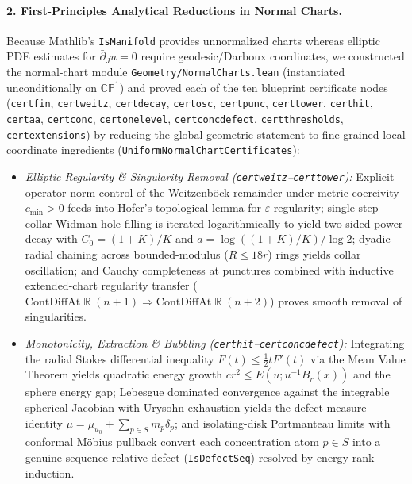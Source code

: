 \documentclass[10pt]{article}
\renewcommand{\_}{\origus\allowbreak}
\newcommand{\CP}{\mathbb{CP}^1}
\newcommand{\R}{\mathbb{R}}
\newcommand{\eps}{\varepsilon}
\newcommand{\code}[1]{\texttt{#1}}
\begin{document}
\paragraph{2. First-Principles Analytical Reductions in Normal Charts.}
Because Mathlib's \code{IsManifold} provides unnormalized charts whereas elliptic PDE estimates for
$\bar\partial_J u = 0$ require geodesic/Darboux coordinates, we constructed the normal-chart module
\code{Geometry/NormalCharts.lean} (instantiated unconditionally on $\CP$) and proved each of the
ten blueprint certificate nodes (\code{cert\_fin}, \code{cert\_weitz}, \code{cert\_decay},
\code{cert\_osc}, \code{cert\_punc}, \code{cert\_tower}, \code{cert\_hit}, \code{cert\_aa},
\code{cert\_conc}, \code{cert\_onelevel}, \code{cert\_concdefect}, \code{cert\_thresholds},
\code{cert\_extensions}) by reducing the global geometric statement to fine-grained local coordinate
ingredients (\code{UniformNormalChartCertificates}):
\begin{itemize}
\item \emph{Elliptic Regularity \& Singularity Removal (\code{cert\_weitz}--\code{cert\_tower}):}
  Explicit operator-norm control of the Weitzenb\"ock remainder under metric coercivity $c_{\min}>0$
  feeds into Hofer's topological lemma for $\eps$-regularity; single-step collar Widman hole-filling
  is iterated logarithmically to yield two-sided power decay with $C_0=(1+K)/K$ and
  $a=\log((1+K)/K)/\log 2$; dyadic radial chaining across bounded-modulus ($R\le 18r$) rings yields
  collar oscillation; and Cauchy completeness at punctures combined with inductive extended-chart
  regularity transfer ($\mathrm{ContDiffAt}\;\R\;(n+1) \Rightarrow \mathrm{ContDiffAt}\;\R\;(n+2)$)
  proves smooth removal of singularities.
\item \emph{Monotonicity, Extraction \& Bubbling (\code{cert\_hit}--\code{cert\_concdefect}):}
  Integrating the radial Stokes differential inequality $F(t) \le \tfrac{1}{2}t F'(t)$ via the Mean
  Value Theorem yields quadratic energy growth $cr^2 \le E(u; u^{-1}B_r(x))$ and the sphere energy
  gap; Lebesgue dominated convergence against the integrable spherical Jacobian with Urysohn
  exhaustion yields the defect measure identity $\mu = \mu_{u_0} + \sum_{p\in S} m_p\delta_p$; and
  isolating-disk Portmanteau limits with conformal M\"obius pullback convert each concentration atom
  $p \in S$ into a genuine sequence-relative defect (\code{IsDefectSeq}) resolved by energy-rank
  induction.
\end{itemize}
\end{document}
